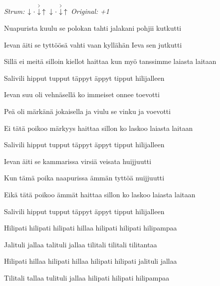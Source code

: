\begin{song}


 \quad
\textit{Strum:} $\Down\Miss\AccentDown\Up\ \Down\Miss\AccentDown\Up$ \quad
\textit{Original: +1}

\large


\large

\bigskip

Nuapurista kuulu se polokan tahti jalakani pohjii kutkutti \par
{}Ievan äiti se tyttöösä vahti vaan kyllähän Ieva sen jutkutti \par
Sillä ei meitä silloin kiellot haittaa kun myö tanssimme laiasta laitaan \par
{}Salivili hipput tupput täppyt äppyt tipput hilijalleen \par

\bigskip

Ievan suu oli vehnäsellä ko immeiset onnee toevotti \par
{}Peä oli märkänä jokaisella ja viulu se vinku ja voevotti \par
{}Ei tätä poikoo märkyys haittaa sillon ko laskoo laiasta laitaan \par
{}Salivili hipput tupput täppyt äppyt tipput hilijalleen \par

\bigskip

Ievan äiti se kammarissa virsiä veisata huijjuutti \par
{}Kun tämä poika naapurissa ämmän tyttöä nuijjuutti \par
{}Eikä tätä poikoo ämmät haittaa sillon ko laskoo laiasta laitaan \par
{}Salivili hipput tupput täppyt äppyt tipput hilijalleen \par

\bigskip

Hilipati hilipati hilipati hillaa hilipati hilipati hilipampaa \par
{}Jalituli jallaa talituli jallaa tilitali tilitali tilitantaa \par
{}Hilipati hillaa hilipati hillaa hilipati hilipati jalituli jallaa \par
{}Tilitali tallaa tulituli jallaa hilipati hilipati hilipampaa \par


\end{song}
